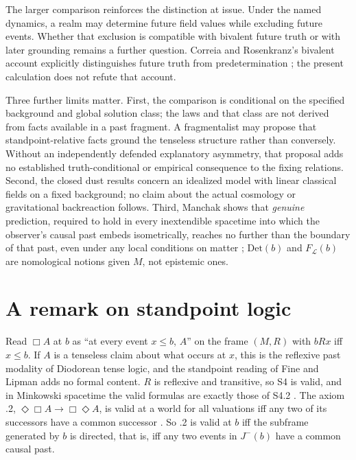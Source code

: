 \documentclass[11pt]{article}
\theoremstyle{definition}
\newcommand{\Det}{\mathrm{Det}}
\begin{document}
The larger comparison reinforces the distinction at issue. Under the named
dynamics, a realm may determine future field values while excluding future
events. Whether that exclusion is compatible with bivalent future truth or
with later grounding remains a further question. Correia and Rosenkranz's
bivalent account explicitly distinguishes future truth from predetermination
\citep[Chap.~7]{CR2018}; the present calculation does not refute that account.

Three further limits matter. First, the comparison is conditional on the
specified background and global solution class; the laws and that class are
not derived from facts available in a past fragment. A fragmentalist may
propose that standpoint-relative facts ground the tenseless structure rather
than conversely. Without an independently defended explanatory asymmetry,
that proposal adds no established truth-conditional or empirical consequence
to the fixing relations. Second, the closed dust results concern an idealized
model with linear classical fields on a fixed background; no claim about the
actual cosmology or gravitational backreaction follows. Third, Manchak shows
that \emph{genuine} prediction, required to
hold in every inextendible spacetime into which the observer's causal past
embeds isometrically, reaches no further than the boundary of that past, even
under any local conditions on matter \citep[pp.~320--321]{Manchak2008};
$\Det(b)$ and $F_{\mathcal L}(b)$ are nomological notions given $M$, not
epistemic ones.

\section{A remark on standpoint logic}\label{sec:logic}

Read $\Box A$ at $b$ as ``at every event $x\le b$, $A$'' on the frame $(M,R)$
with $bRx$ iff $x\le b$. If $A$ is a tenseless claim about what occurs at $x$,
this is the reflexive past modality of Diodorean tense logic, and the
standpoint reading of Fine and Lipman \citep{Fine2005,Lipman2023} adds no
formal content. $R$ is reflexive and transitive, so S4 is valid, and in
Minkowski spacetime the valid formulas are exactly those of S4.2
\citep{Goldblatt1980}. The axiom .2, $\Diamond\Box A\to\Box\Diamond A$, is valid at a
world for all valuations iff any two of its successors have a common
successor \citep{BdRV2001}. So .2 is valid at $b$ iff the subframe generated
by $b$ is directed, that is, iff any two events in $J^-(b)$ have a common
causal past.
\end{document}
